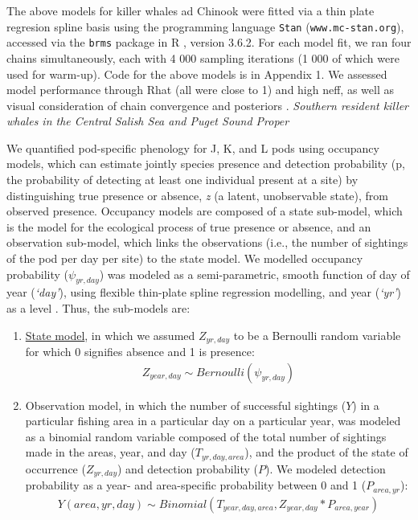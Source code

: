 \documentclass{article}
\begin{document}
The above models for killer whales ad Chinook were fitted via a thin plate regresion spline basis using the programming language \texttt{Stan} \citep{Carpenter:2016aa} (\texttt{www.mc-stan.org}), accessed via the \texttt{brms}\citep{brms2017,brms2018} package in R \citep{Rcore2019}, version 3.6.2. For each model fit, we ran four chains simultaneously, each with 4 000 sampling iterations (1 000 of which were used for warm-up). Code for the above models is in Appendix 1. We assessed model performance through Rhat (all were close to 1) and high neff, as well as visual consideration of chain convergence and posteriors \citep{BDA}.
\emph{Southern resident killer whales in the Central Salish Sea and Puget Sound Proper}
\par We quantified pod-specific phenology for J, K, and L pods using occupancy models, which can estimate jointly species presence and detection probability (p, the probability of detecting at least one individual present at a site) by distinguishing true presence or absence, \emph{z} (a latent, unobservable state), from observed presence. Occupancy models are composed of a state sub-model, which is the model for the ecological process of true presence or absence, and an observation sub-model, which links the observations (i.e., the number of sightings of the pod per day per site) to the state model. We modelled occupancy probability ($\psi_{yr,day}$) was modeled as a semi-parametric, smooth function of day of year (\emph{`day'}), using flexible thin-plate spline regression modelling, and year (\emph{`yr'}) as a level \citep{strebel2014}. Thus, the sub-models are:
\begin{enumerate}

\item \underline{State model}, in which we assumed $Z_{yr,day}$ to be a Bernoulli random variable for which 0 signifies absence and 1 is presence:
 \begin{align*}
Z_{year,day} \sim Bernoulli (\psi_{yr,day})
\end{align*}
  \item Observation model, in which the number of successful sightings ($Y$) in a particular fishing area in a particular day on a particular year, was modeled as a binomial random variable composed of the total number of sightings made in the areas, year, and day ($T_{yr,day,area}$), and the product of the state of occurrence ($Z_{yr,day}$) and detection probability ($P$). We modeled detection probability as a year- and area-specific probability between 0 and 1 ($P_{area,yr}$):
\begin{align*}
Y(area,yr,day) \sim Binomial (T_{year, day,area},Z_{year,day}*P_{area,year})
\end{align*}
                                                                             \end{enumerate}                                                       
\end{document}
